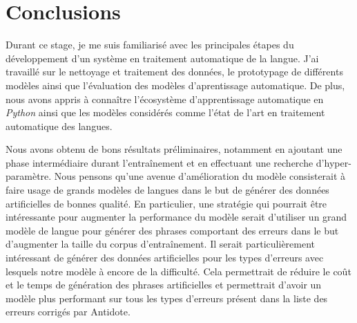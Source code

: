 \documentclass[12pt,twoside,maitrise]{dms}
\theoremstyle{definition}
\numberwithin{equation}{section}
\numberwithin{table}{chapter}
\numberwithin{figure}{chapter}
\begin{document}
\chapter{Conclusions}
Durant ce stage, je me suis familiarisé avec les principales étapes du
développement d'un système en traitement automatique de la langue. J'ai
travaillé sur le nettoyage et traitement des données, le prototypage de
différents modèles ainsi que l'évaluation des modèles d'aprentissage
automatique. De plus, nous avons appris à connaître l'écosystème
d'apprentissage automatique en \textit{Python} ainsi que les modèles considérés
comme l'état de l'art en traitement automatique des langues.

Nous avons obtenu de bons résultats préliminaires, notamment en ajoutant une
phase intermédiaire durant l'entraînement et en effectuant une recherche
d'hyper-paramètre. Nous pensons qu'une avenue d'amélioration du modèle
consisterait à faire usage de grands modèles de langues dans le but de générer
des données artificielles de bonnes qualité. En particulier, une stratégie qui
pourrait être intéressante pour augmenter la performance du modèle serait
d'utiliser un grand modèle de langue pour générer des phrases comportant des
erreurs dans le but d'augmenter la taille du corpus d'entraînement. Il serait
particulièrement intéressant de générer des données artificielles pour les
types d'erreurs avec lesquels notre modèle à encore de la difficulté. Cela
permettrait de réduire le coût et le temps de génération des phrases
artificielles et permettrait d'avoir un modèle plus performant sur tous les
types d'erreurs présent dans la liste des erreurs corrigés par Antidote.




\end{document}
